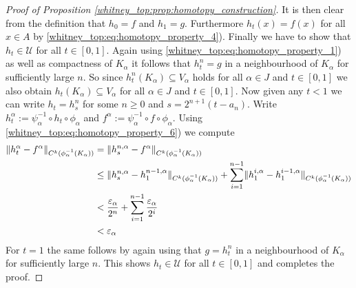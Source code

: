 \begin{proof}[Proof of Proposition \ref{whitney_top:prop:homotopy_construction}]
    It is then clear from the definition that $h_0 = f$ and $h_1 = g$. Furthermore $h_t(x) = f(x)$ for all $x \in A$ by \ref{whitney_top:eq:homotopy_property_4}). Finally we have to show that $h_t \in \mathcal{U}$ for all $t \in [0,1]$. Again using \ref{whitney_top:eq:homotopy_property_1}) as well as compactness of $K_\alpha$ it follows that $h_t^n = g$ in a neighbourhood of $K_\alpha$ for sufficiently large $n$. So since $h_t^n(K_\alpha) \subseteq V_\alpha$ holds for all $\alpha \in J$ and $t \in [0,1]$ we also obtain $h_t(K_\alpha) \subseteq V_\alpha$ for all $\alpha \in J$ and $t \in [0,1]$. Now given any $t < 1$ we can write $h_t = h_s^n$ for some $n \geq 0$ and $s = 2^{n+1}(t - a_n)$. Write $h_t^{\alpha} := \psi_\alpha^{-1} \circ h_t \circ \phi_\alpha$ and $f^{\alpha} := \psi_\alpha^{-1} \circ f \circ \phi_\alpha$. Using \ref{whitney_top:eq:homotopy_property_6}) we compute 
    \begin{align*}
        \lVert h_t^{\alpha} - f^{\alpha}\rVert_{C^k(\phi_\alpha^{-1}(K_\alpha))} &= \lVert h_s^{n,\alpha} - f^{\alpha}\rVert_{C^k(\phi_\alpha^{-1}(K_\alpha))} \\
        &\leq \lVert h_s^{n,\alpha} - h_1^{n-1,\alpha}\rVert_{C^k(\phi_\alpha^{-1}(K_\alpha))} + \sum_{i=1}^{n-1} \lVert h_1^{i,\alpha} - h_1^{i-1,\alpha}\rVert_{C^k(\phi_\alpha^{-1}(K_\alpha))} \\
        &< \frac{\varepsilon_\alpha}{2^n} + \sum_{i=1}^{n-1} \frac{\varepsilon_\alpha}{2^i} \\
        &< \varepsilon_\alpha
    \end{align*}
    For $t = 1$ the same follows by again using that $g = h_t^n$ in a neighbourhood of $K_\alpha$ for sufficiently large $n$. This shows $h_t \in \mathcal{U}$ for all $t \in [0,1]$ and completes the proof. 
\end{proof}

